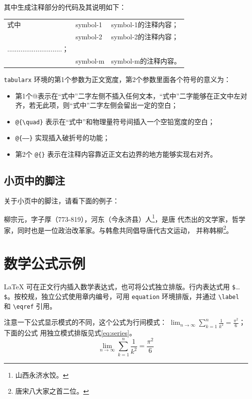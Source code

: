 其中生成注释部分的代码及其说明如下：
\begin{latex}
\begin{tabularx}{\textwidth}{@{}l@{\quad}l@{——}X@{}}
式中 & symbol-1 & symbol-1的注释内容；\\
     & symbol-2 & symbol-2的注释内容；\\
     .............................；\\
     & symbol-m & symbol-m的注释内容。
\end{tabularx}
\end{latex}

\texttt{tabularx} 环境的第1个参数为正文宽度，第2个参数里面各个符号的意义为：
\begin{itemize}
\item 第1个@{}表示在“式中”二字左侧不插入任何文本，“式中”二字能够在正文中左对
齐，若无此项，则“式中”二字左侧会留出一定的空白；
\item \verb|@{\quad}| 表示在“式中”和物理量符号间插入一个空铅宽度的空白；
\item \verb|@{——}| 实现插入破折号的功能；
\item 第2个 \verb|@{}| 表示在注释内容靠近正文右边界的地方能够实现右对齐。
\end{itemize}

\subsection{小页中的脚注}

关于小页中的脚注，请看下面的例子：
 
\begin{minipage}[t]{\linewidth-\parindent}
柳宗元，字子厚（773-819），河东（今永济县）人\footnote{山西永济水饺。}，是唐
代杰出的文学家，哲学家，同时也是一位政治改革家。与韩愈共同倡导唐代古文运动，
并称韩柳\footnote{唐宋八大家之首二位。}。
\end{minipage}

\section{数学公式示例}
\label{sec:equation}

\LaTeX{} 可在正文行内插入数学表达式，也可将公式独立排版。行内表达式用
\verb|$|\ldots \verb|$|。按校规，独立公式使用章内编号，可用
\texttt{equation} 环境排版，并通过 \verb|\label| 和 \verb|\eqref| 引用。

注意一下公式显示模式的不同，这个公式为行间模式：
$\lim_{n \to \infty} \sum_{k=1}^n \frac{1}{k^2} = \frac{\pi^2}{6}$；下面的公式
用独立模式排版见式\eqref{eq:series}。
\begin{equation}
\label{eq:series}
\lim_{n \to \infty} \sum_{k=1}^n \frac{1}{k^2} = \frac{\pi^2}{6}
\end{equation}

